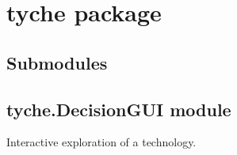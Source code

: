 \documentclass[letterpaper,10pt,english]{sphinxmanual}
\begin{document}
\section{tyche package}
\label{\detokenize{doc-src/tyche:tyche-package}}\label{\detokenize{doc-src/tyche::doc}}

\subsection{Submodules}
\label{\detokenize{doc-src/tyche:submodules}}

\subsection{tyche.DecisionGUI module}
\label{\detokenize{doc-src/tyche:module-tyche.DecisionGUI}}\label{\detokenize{doc-src/tyche:tyche-decisiongui-module}}
Interactive exploration of a technology.
\end{document}
